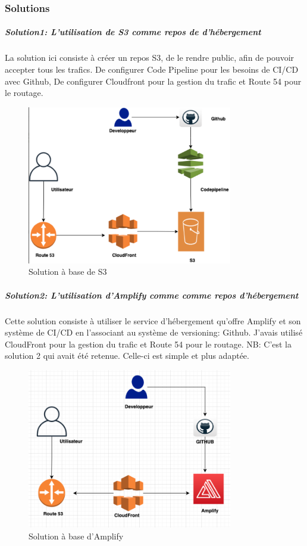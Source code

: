 \subsubsection{Solutions}
\subparagraph{Solution1: L’utilisation de S3 comme repos de d'hébergement}
La solution ici consiste à créer un repos S3, de le rendre public, afin de pouvoir accepter tous les trafics.
De configurer Code Pipeline pour les besoins de CI/CD avec Github, De configurer Cloudfront pour la
gestion du trafic et Route 54 pour le routage.
 \begin{figure}[!th]
            \centering
                \includegraphics[width=0.8\textwidth]{Figures/S3}
	       \decoRule
		\caption[Solution à base de S3]{Solution à base de S3}
	\label{fig:S3}
	\end{figure}
\subparagraph{Solution2: L’utilisation d’Amplify comme comme repos d'hébergement}
Cette solution consiste à utiliser le service d’hébergement qu’offre Amplify et son système de CI/CD en
l’associant au système de versioning: Github. J'avais utilisé CloudFront pour la gestion du trafic et Route 54
pour le routage.
NB: C’est la solution 2 qui avait été retenue. Celle-ci est simple et plus adaptée.
 \begin{figure}[!th]
            \centering
                \includegraphics[width=0.8\textwidth]{Figures/amplify}
	       \decoRule
		\caption[Solution à base d'Amplify]{Solution à base d'Amplify}
	\label{fig:Amplify}
	\end{figure}
	
